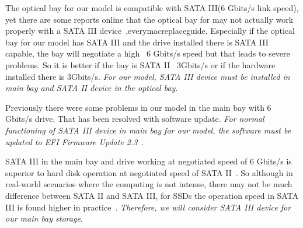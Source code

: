 The optical bay for our model is compatible with SATA III(6 Gbits/s link speed), yet there are some reports online that the optical bay for \model may not actually work properly with a SATA III device~\cite{owcopsatabad,owcopsatabad2,owcsataissues,macrumoursssdreplaceguide,appleforssdissue},everymacreplaceguide. Especially if the optical bay for our model has SATA III and the drive installed there is SATA III capable, the bay will negotiate a high ~6 Gbits/s speed but that leads to severe problems. So it is better if the bay is SATA II ~3Gbits/s or if the hardware installed there is 3Gbits/s. \emph{ For our model, SATA III device must be installed in main bay and SATA II device in the optical bay}. 

Previously there were some problems in our model in the main bay with 6 Gbits/s drive. That has been resolved with software update. \emph{ For normal functioning of SATA III device in main bay for our model, the software must be updated to EFI Firmware Update 2.3~\cite{owcsataissues,appleefiupdate,appleefiupdate2}}.

SATA III in the main bay and drive working at negotiated speed of 6 Gbits/s is superior to hard disk operation at negotiated speed of SATA II~\cite{tomshardsataperf}. So although in real-world scenarios where the computing is not intense, there may not be much difference between SATA II and SATA III, for SSDs the operation speed in SATA III is found higher in practice~\cite{tomshardsatadiff,tomshardsatadiff2}. \emph{ Therefore, we will consider SATA III device for our main bay storage}.

